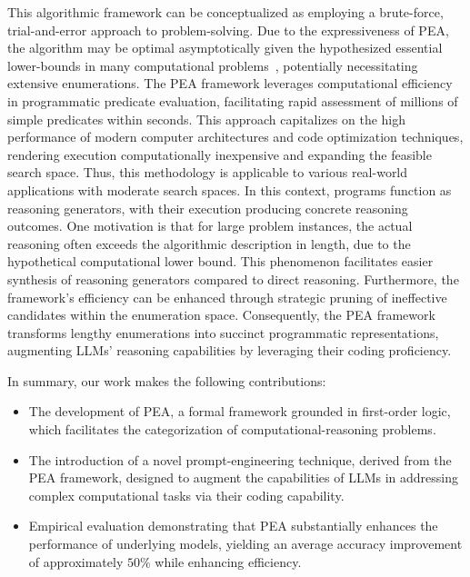 This algorithmic framework can be conceptualized as employing a brute-force, trial-and-error approach to problem-solving. Due to the expressiveness of PEA, the algorithm may be optimal asymptotically given the hypothesized essential lower-bounds in many computational problems~\citep{SETH,fgc}, potentially necessitating extensive enumerations. The PEA framework leverages computational efficiency in programmatic predicate evaluation, facilitating rapid assessment of millions of simple predicates within seconds. This approach capitalizes on the high performance of modern computer architectures and code optimization techniques, rendering execution computationally inexpensive and expanding the feasible search space. Thus, this methodology is applicable to various real-world applications with moderate search spaces. In this context, programs function as reasoning generators, with their execution producing concrete reasoning outcomes.
%
One motivation is that for large problem instances, the actual reasoning often exceeds the algorithmic description in length, due to the hypothetical computational lower bound. This phenomenon facilitates easier synthesis of reasoning generators compared to direct reasoning. Furthermore, the framework's efficiency can be enhanced through strategic pruning of ineffective candidates within the enumeration space. 
Consequently, the PEA framework transforms lengthy enumerations into succinct programmatic representations, augmenting LLMs' reasoning capabilities by leveraging their coding proficiency. 

In summary, our work makes the following contributions: %
\begin{itemize}[parsep=0pt,itemsep=1pt,leftmargin=13pt]
    \item The development of PEA, a formal framework grounded in first-order logic, which facilitates the categorization of computational-reasoning problems.
    \item The introduction of a novel prompt-engineering technique, derived from the PEA framework, designed to augment the capabilities of LLMs in addressing complex computational tasks via their coding capability.
    \item  Empirical evaluation demonstrating that PEA substantially enhances the performance of underlying models, yielding an average accuracy improvement of approximately $50\%$ while enhancing efficiency.
\end{itemize}